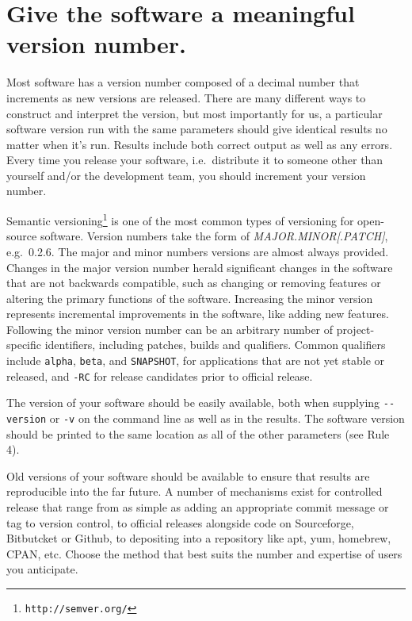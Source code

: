 \documentclass[10pt]{article}
\newcommand{\withurl}[2]{{#1}\footnote{\texttt{#2}}}
\begin{document}
\section{Give the software a meaningful version number.}

Most software has a version number composed of a decimal number that
increments as new versions are released. There are many different ways
to construct and interpret the version, but most importantly for us, a
particular software version run with the same parameters should give
identical results no matter when it's run. Results include both correct
output as well as any errors.
Every time you release your software, i.e.~distribute it to
someone other than yourself and/or the development team, you should
increment your version number.

\withurl{Semantic versioning}{http://semver.org/} is one of the most common
types of versioning for open-source software. Version numbers take the
form of \emph{MAJOR.MINOR{[}.PATCH{]}}, e.g.~0.2.6. The major and
minor numbers versions are almost always provided. Changes in the major
version number herald significant changes in the software that are not
backwards compatible, such as changing or removing features or altering
the primary functions of the software. Increasing the minor version
represents incremental improvements in the software, like adding new
features. Following the minor version number can be an arbitrary number
of project-specific identifiers, including patches, builds and qualifiers.
Common qualifiers include \texttt{alpha}, \texttt{beta}, and \texttt{SNAPSHOT}, for applications that are
not yet stable or released, and \texttt{-RC} for release candidates prior
to official release.

The version of your software should be easily available, both when
supplying \texttt{-\/-version} or \texttt{-v} on the command line as
well as in the results. The software version should be printed to the
same location as all of the other parameters (see Rule 4).

Old versions of your software should be available to ensure that results
are reproducible into the far future. A number of mechanisms exist for
controlled release that range from as simple as adding an appropriate
commit message or tag to version control, to official releases alongside
code on Sourceforge, Bitbutcket or Github, to depositing into a
repository like apt, yum, homebrew, CPAN, etc. Choose the method that
best suits the number and expertise of users you anticipate.
\end{document}
